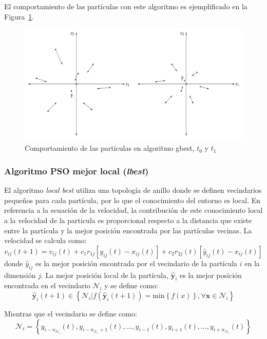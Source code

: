 \documentclass{article}
\begin{document}
El comportamiento de las partículas con este algoritmo es ejemplificado en la Figura~\ref{fig:gbest-behavior}.
\begin{figure}[]
	\centering
	\includegraphics[width=\textwidth]{../resources/gbest-behavior}
	\caption{Comportamiento de las partículas en algoritmo gbest, $t_0$ y $t_1$}
	\label{fig:gbest-behavior}
\end{figure}
\subsubsection{Algoritmo PSO mejor local (\emph{lbest})} 
El algoritmo \emph{local best} utiliza una topología de anillo donde se definen vecindarios pequeños para cada partícula, por lo que el conocimiento del entorno es local.
En referencia a la ecuación de la velocidad, la contribución de este conocimiento local a la velocidad de la particula es proporcional respecto a la distancia que existe entre la partícula y la mejor posición encontrada por las partículas vecinas.
La velocidad se calcula como:
\begin{equation}
	v_{ij}(t+1)=v_{ij}(t) + c_1 r_{1j}[y_{ij}(t) - x_{ij}(t)] + c_2 r_{2j}(t) [\hat{y}_{ij}(t) - x_{ij}(t)]
	\label{eq:velocidad-lbest}
\end{equation}
donde $\hat{y}_{ij}$ es la mejor posición encontrada por el vecindario de la partícula $i$ en la dimensión $j$.
La mejor posición local de la partícula, $\mathbf{\hat{y}}_i$ es la mejor posición encontrada en el vecindario $\mathcal{N}_i$ y se define como:
$$
\mathbf{\hat{y}}_i (t+1) \in \left \{ \mathcal{N}_i | f( \mathbf{\hat{y}}_i (t+1) ) = \text{min} \left \{ f(x) \right \}, \forall \mathbf{x} \in \mathcal{N}_i \right \}
$$

Mientras que el vecindario se define como:
$$
\mathcal{N}_i = \left \{ y_{{i-n}_{\mathcal{N}_i}}(t), y_{i-n_{\mathcal{N}_i}+1 }(t), \ldots, y_{i-1}(t), y_{i+1}(t), \ldots, y_{i+n_{\mathcal{N}_i} }(t) \right \}
$$
\end{document}
